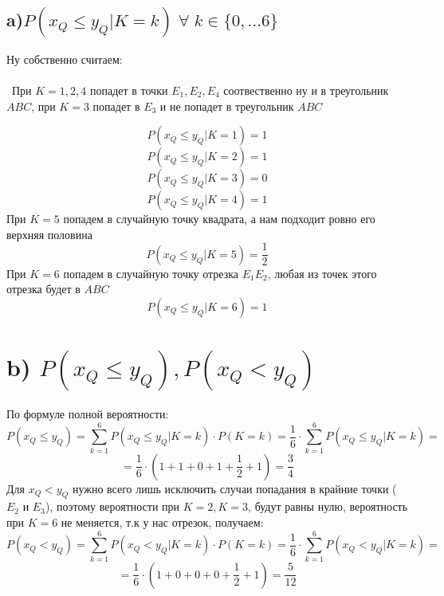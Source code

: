 \documentclass[a4paper,12pt]{article}
\begin{document}
\subsection*{a)$P(x_Q \leq y_Q | K = k) \; \forall \; k \in \{0, \ldots 6\}$}
Ну собственно считаем:
\\\\\
При $K = 1, 2, 4$ попадет в точки $E_1, E_2, E_4$ соотвественно ну и в треугольник $ABC$, при $ K = 3$ попадет в $E_3$  и не попадет в треугольник $ABC$

\[
P(x_Q \leq y_Q | K = 1) = 1
\]
\[
P(x_Q \leq y_Q| K = 2) = 1
\]
\[
P(x_Q \leq y_Q | K = 3) = 0
\]
\[
P(x_Q\leq y_Q| K = 4) = 1
\]
При $K = 5$ попадем в случайную точку квадрата, а нам подходит ровно его верхняя половина
\[
P(x_Q\leq y_Q | K = 5) = \frac{1}{2}
\]
При $K = 6$  попадем в случайную точку отрезка $E_1E_2$, любая из точек этого отрезка будет в $ABC$
\[
P(x_Q \leq y_Q | K = 6) = 1
\]
\section*{b) $P(x_Q \leq y_Q), P(x_Q < y_Q)$}
По формуле полной вероятности:
\[
P(x_Q \leq y_Q) = \sum_{k = 1}^6 P(x_Q \leq y_Q | K = k) \cdot P(K = k) = \frac{1}{6} \cdot \sum_{k = 1}^6 P(x_Q \leq y_Q | K = k) =
\]
\[
=
 \frac{1}{6} \cdot (1 + 1 + 0 + 1 + \frac12 + 1) =  \frac34
\]
Для $x_Q< y_Q $ нужно всего лишь исключить случаи попадания в крайние точки ($E_2$ и $E_3$), поэтому вероятности при $K = 2, K = 3$, будут равны нулю, вероятность при $K = 6$ не меняется, т.к у нас отрезок, получаем:
\[
P(x_Q < y_Q) = \sum_{k = 1}^6 P(x_Q < y_Q | K = k) \cdot P(K = k) = \frac{1}{6} \cdot \sum_{k = 1}^6 P(x_Q < y_Q | K = k) =
\]
\[
=
 \frac{1}{6} \cdot (1 + 0+ 0 + 0 + \frac12 + 1) =  \frac{5}{12}
\]
\end{document}
